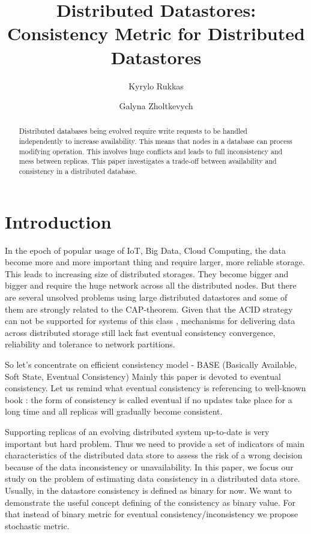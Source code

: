\documentclass{llncs}
\begin{document}
\title{Distributed Datastores: Consistency Metric for Distributed Datastores}
\author{Kyrylo Rukkas\and Galyna Zholtkevych}
\maketitle
\begin{abstract}
Distributed databases being evolved require write requests to be handled independently to increase availability.
This means that nodes in a database can process modifying operation. This involves huge conflicts and leads to
full inconsistency and mess between replicas. This paper investigates a trade-off between availability and consistency
in a distributed database.
\end{abstract}

\section{Introduction}\label{sec:intro}
In the epoch of popular usage of IoT, Big Data, Cloud Computing, the data become more and more important thing and require larger, more reliable storage. This leads to increasing size of distributed storages. They become bigger and bigger and require the huge network across all the distributed nodes.
But there are several unsolved problems using large distributed datastores and some of them are strongly related to the CAP-theorem. 
Given that the ACID strategy can not be supported for systems of this class \cite{bib:brewer}, mechanisms for delivering data across distributed storage still lack fast eventual consistency convergence, reliability and tolerance to network partitions.

So let's concentrate on efficient consistency model - BASE (Basically Available, Soft State, Eventual Consistency) \cite{bib:acid_vs_base}
Mainly this paper is devoted to eventual consistency. Let us remind what eventual consistency is referencing to well-known book \cite{bib:tanenbaum}: the form of consistency is called eventual if no updates take place for a long time and all replicas will gradually become consistent.

Supporting replicas of an evolving distributed system up-to-date is very important but hard problem. Thus we need to provide a set of indicators of main characteristics of the distributed data store to assess the risk of a wrong decision because of the data inconsistency or unavailability.
In this paper, we focus our study on the problem of estimating data consistency in a distributed data store. Usually, in the datastore consistency is defined as binary for now. We want to demonstrate the useful concept defining of the consistency as binary value. 
For that instead of binary metric for eventual consistency/inconsistency we propose stochastic metric.
\end{document}
